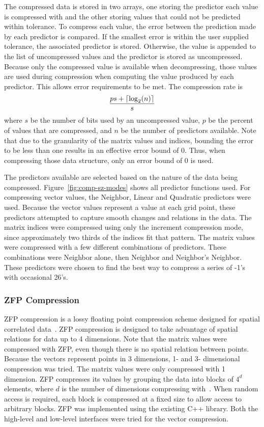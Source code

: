 The compressed data is stored in two arrays, one storing the predictor each value is compressed with and the other storing values that could not be predicted within tolerance.
To compress each value, the error between the prediction made by each predictor is compared.
If the smallest error is within the user supplied tolerance, the associated predictor is stored.
Otherwise, the value is appended to the list of uncompressed values and the predictor is stored as uncompressed.
Because only the compressed value is available when decompressing, those values are used during compression when computing the value produced by each predictor.
This allows error requirements to be met.
The compression rate is
\[
	\frac{ps+\lceil\log_2(n)\rceil}{s}
\]
where \(s\) be the number of bits used by an uncompressed value, \(p\) be the percent of values that are compressed, and \(n\) be the number of predictors available.
Note that due to the granularity of the matrix values and indices, bounding the error to be less than one results in an effective error bound of 0.
Thus, when compressing those data structure, only an error bound of 0 is used.



The predictors available are selected based on the nature of the data being compressed.
Figure~\ref{fig:comp-sz-modes} shows all predictor functions used.
For compressing vector values, the Neighbor, Linear and Quadratic predictors were used.
Because the vector values represent a value at each grid point, these predictors attempted to capture smooth changes and relations in the data.
The matrix indices were compressed using only the increment compression mode, since approximately two thirds of the indices fit that pattern.
The matrix values were compressed with a few different combinations of predictors.
These combinations were Neighbor alone, then Neighbor and Neighbor's Neighbor.
These predictors were chosen to find the best way to compress a series of -1's with occasional 26's.

\subsubsection{ZFP Compression}
ZFP compression is a lossy floating point compression scheme designed for spatial correlated data~\cite{Lindstrom:2014:zfp}.
ZFP compression is designed to take advantage of spatial relations for data up to 4 dimensions.
Note that the matrix values were compressed with ZFP, even though there is no spatial relation between points.
Because the vectors represent points in 3 dimensions, 1- and 3- dimensional compression was tried.
The matrix values were only compressed with 1 dimension.
ZFP compresses its values by grouping the data into blocks of \(4^d\) elements, where \(d\) is the number of dimensions compressing with~\cite{Lindstrom:2014:zfp}.
When random access is required, each block is compressed at a fixed size to allow access to arbitrary blocks.
ZFP was implemented using the existing C++ library.
Both the high-level and low-level interfaces were tried for the vector compression.


